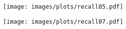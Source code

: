 \documentclass[10pt,twocolumn,letterpaper]{article}
\begin{document}
\begin{figure*}[t]
  \centering
  \begin{subfigure}[b]{0.48\textwidth}
  \texttt{[image: images/plots/recall05.pdf]}
    \end{subfigure}%
    \begin{subfigure}[b]{0.48\textwidth}
  \texttt{[image: images/plots/recall07.pdf]}
    \end{subfigure}%

\end{figure*}
\end{document}
